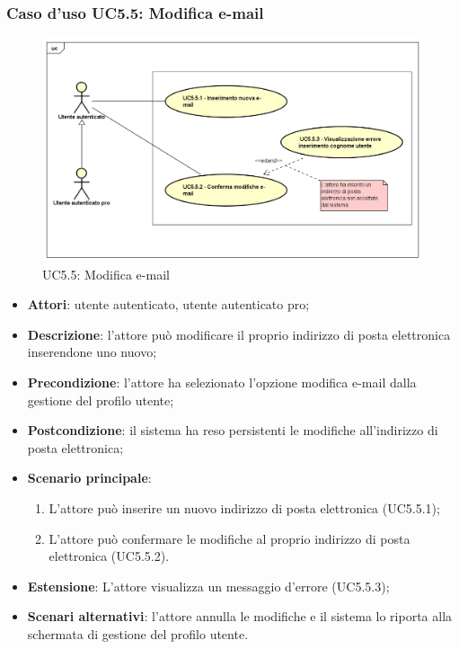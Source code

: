 \subsubsection{Caso d'uso UC5.5: Modifica e-mail}
\label{UC5.5}
\begin{figure}[h]
	\centering
	\includegraphics[scale=0.5,keepaspectratio]{UML/UC5_5.png}
	\caption{UC5.5: Modifica e-mail}
\end{figure}

\begin{itemize}
	\item \textbf{Attori}: utente autenticato, utente autenticato pro;
	\item \textbf{Descrizione}: l'attore può modificare il proprio indirizzo di posta elettronica inserendone uno nuovo;
	\item \textbf{Precondizione}:  l'attore ha selezionato l'opzione modifica e-mail dalla gestione del profilo utente; 
	\item \textbf{Postcondizione}: il sistema ha reso persistenti le modifiche all'indirizzo di posta elettronica;
	\item \textbf{Scenario principale}:
		\begin{enumerate}
			\item L'attore può inserire un nuovo indirizzo di posta elettronica (UC5.5.1);
			\item L'attore può confermare le modifiche al proprio indirizzo di posta elettronica (UC5.5.2).
		\end{enumerate}
		\item \textbf{Estensione}: L'attore visualizza un messaggio d'errore (UC5.5.3);
	\item \textbf{Scenari alternativi}: l'attore annulla le modifiche e il sistema lo riporta alla schermata di gestione del profilo utente.
\end{itemize}

